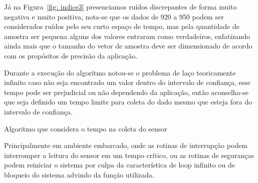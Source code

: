 Já na Figura~\ref{fig: indice3} presenciamos ruídos discrepantes de forma muito negativa e muito positiva, nota-se que os dados de 920 a 950 podem ser considerados ruídos pelo seu curto espaço de tempo, mas pela quantidade de amostra ser pequena alguns dos valores entraram como verdadeiros, enfatizando ainda mais que o tamanho do vetor de amostra deve ser dimensionado de acordo com os propósitos de precisão da aplicação.

Durante a execução do algoritmo notou-se o problema de laço teoricamente infinito caso não seja encontrado um valor dentro do intervalo de confiança, esse tempo pode ser prejudicial ou não dependendo da aplicação, então aconselha-se que seja definido um tempo limite para coleta do dado mesmo que esteja fora do intervalo de confiança. 

\begin{algorithm}[H]
    \caption{Algoritmo que considera o tempo na coleta do sensor}
    \label{algoritmo:alg_com_temp}
\end{algorithm}

Principalmente em ambiente embarcado, onde as rotinas de interrupção podem interromper a leitura do sensor em um tempo crítico, ou as rotinas de seguranças podem reiniciar o sistema por culpa da característica de loop infinito ou de bloqueio do sistema advindo da função utilizada.